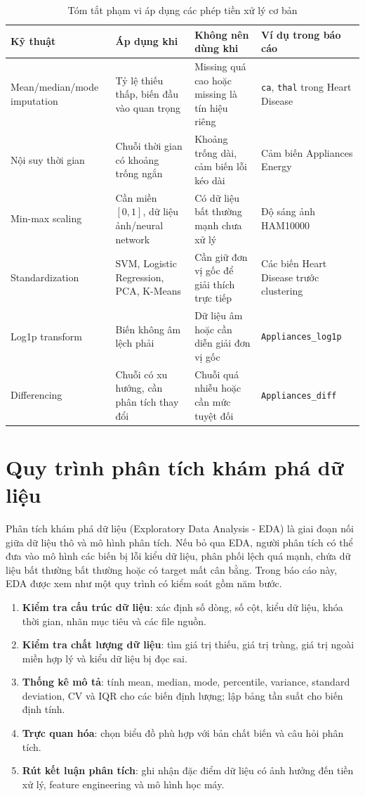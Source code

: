 \begin{table}[H]
\centering
\caption{Tóm tắt phạm vi áp dụng các phép tiền xử lý cơ bản}
\label{tab:chapter1_preprocess_scope}
\small
\begin{tabular}{p{}p{}p{}p{}}
\toprule
Kỹ thuật & Áp dụng khi & Không nên dùng khi & Ví dụ trong báo cáo \\
\midrule
Mean/median/mode imputation & Tỷ lệ thiếu thấp, biến đầu vào quan trọng & Missing quá cao hoặc missing là tín hiệu riêng & \texttt{ca}, \texttt{thal} trong Heart Disease \\
Nội suy thời gian & Chuỗi thời gian có khoảng trống ngắn & Khoảng trống dài, cảm biến lỗi kéo dài & Cảm biến Appliances Energy \\
Min-max scaling & Cần miền $[0,1]$, dữ liệu ảnh/neural network & Có dữ liệu bất thường mạnh chưa xử lý & Độ sáng ảnh HAM10000 \\
Standardization & SVM, Logistic Regression, PCA, K-Means & Cần giữ đơn vị gốc để giải thích trực tiếp & Các biến Heart Disease trước clustering \\
Log1p transform & Biến không âm lệch phải & Dữ liệu âm hoặc cần diễn giải đơn vị gốc & \texttt{Appliances\_log1p} \\
Differencing & Chuỗi có xu hướng, cần phân tích thay đổi & Chuỗi quá nhiễu hoặc cần mức tuyệt đối & \texttt{Appliances\_diff} \\
\bottomrule
\end{tabular}
\end{table}

\section{Quy trình phân tích khám phá dữ liệu}

Phân tích khám phá dữ liệu (Exploratory Data Analysis - EDA) là giai đoạn nối giữa dữ liệu thô và mô hình phân tích. Nếu bỏ qua EDA, người phân tích có thể đưa vào mô hình các biến bị lỗi kiểu dữ liệu, phân phối lệch quá mạnh, chứa dữ liệu bất thường bất thường hoặc có target mất cân bằng. Trong báo cáo này, EDA được xem như một quy trình có kiểm soát gồm năm bước.

\begin{enumerate}[leftmargin=2.2em,label=\textbf{\arabic*.}]
 \item \textbf{Kiểm tra cấu trúc dữ liệu}: xác định số dòng, số cột, kiểu dữ liệu, khóa thời gian, nhãn mục tiêu và các file nguồn.
 \item \textbf{Kiểm tra chất lượng dữ liệu}: tìm giá trị thiếu, giá trị trùng, giá trị ngoài miền hợp lý và kiểu dữ liệu bị đọc sai.
 \item \textbf{Thống kê mô tả}: tính mean, median, mode, percentile, variance, standard deviation, CV và IQR cho các biến định lượng; lập bảng tần suất cho biến định tính.
 \item \textbf{Trực quan hóa}: chọn biểu đồ phù hợp với bản chất biến và câu hỏi phân tích.
 \item \textbf{Rút kết luận phân tích}: ghi nhận đặc điểm dữ liệu có ảnh hưởng đến tiền xử lý, feature engineering và mô hình học máy.
\end{enumerate}

